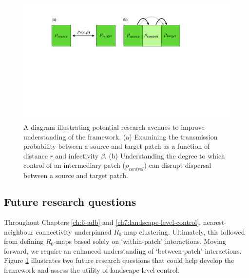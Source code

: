

\begin{figure}
    \centering
    \includegraphics[scale=0.35]{chapter7/figures/figure5-future-reserach.pdf}
    \caption{A diagram illustrating potential research avenues to improve understanding of the framework. 
    (a) Examining the transmission probability between a source and target patch as a function of distance $r$ and infectivity $\beta$. 
    (b) Understanding the degree to which control of an intermediary patch ($\rho_{control}$) can disrupt dispersal between a source and target patch.}
    \label{fig:future-research}
\end{figure}

\subsection{Future research questions}

Throughout Chapters \ref{ch:6-adb} and \ref{ch7:landscape-level-control}, nearest-neighbour connectivity underpinned $R_0$-map clustering.
Ultimately, this followed from defining $R_0$-maps based solely on `within-patch' interactions. Moving forward, we require an enhanced understanding of `between-patch' interactions.
Figure \ref{fig:future-research} illustrates two future research questions that could help develop the framework and assess the utility of landscape-level control.

